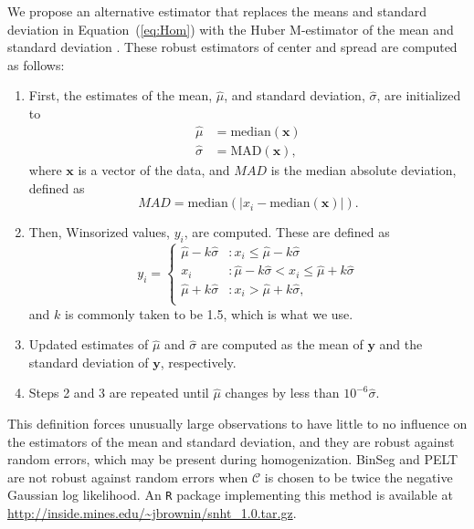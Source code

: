 \documentclass[12pt]{article}
\def\ni{\noindent}
\begin{document}
\begin{doublespacing}
We propose an alternative estimator that replaces the means and standard deviation in Equation~(\ref{eq:Hom}) with the Huber M-estimator of the mean and standard deviation \cite{huber11}.  These robust estimators of center and spread are computed as follows:
\begin{enumerate}
	\item First, the estimates of the mean, $\hat{\mu}$, and standard deviation, $\hat{\sigma}$, are initialized to
	\begin{align*}
		\hat{\mu} &= \mbox{median}(\mathbf{x})\\
		\hat{\sigma} &= \mbox{MAD}(\mathbf{x}),
	\end{align*}
	where $\mathbf{x}$ is a vector of the data, and $MAD$ is the median absolute deviation, defined as
	\begin{equation*}
		MAD = \mbox{median}( \lvert x_i - \mbox{median}(\mathbf{x}) \rvert ).
	\end{equation*}
	\item Then, Winsorized values, $y_i$, are computed.  These are defined as
	\begin{equation*}
		y_i = \left\{ \begin{array}{ll}
			\hat{\mu}-k \hat{\sigma} & : x_i \leq \hat{\mu}-k \hat{\sigma}\\
			x_i & : \hat{\mu}-k \hat{\sigma} < x_i \leq \hat{\mu}+k \hat{\sigma}\\
			\hat{\mu}+k \hat{\sigma} & : x_i > \hat{\mu}+k \hat{\sigma},\\
		\end{array} \right.
	\end{equation*}
	and $k$ is commonly taken to be 1.5, which is what we use.
	\item Updated estimates of $\hat{\mu}$ and $\hat{\sigma}$ are computed as the mean of $\mathbf{y}$ and the standard deviation of $\mathbf{y}$, respectively.
	\item Steps 2 and 3 are repeated until $\hat{\mu}$ changes by less than $10^{-6} \hat{\sigma}$.
\end{enumerate}

\ni This definition forces unusually large observations to have little to no influence on the estimators of the mean and standard deviation, and they are robust against random errors, which may be present during homogenization.  BinSeg and PELT are not robust against random errors when $\mathcal{C}$ is chosen to be twice the negative Gaussian log likelihood.  An \texttt{R} package implementing this method is available at \url{http://inside.mines.edu/~jbrownin/snht_1.0.tar.gz}.


\end{doublespacing}
\end{document}
